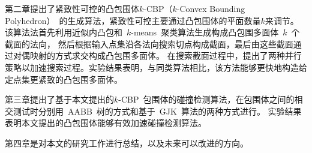 第二章提出了紧致性可控的凸包围体$k$-CBP（$k$-Convex Bounding Polyhedron）~的生成算法，紧致性可控主要通过凸包围体的平面数量$k$来调节。
该算法法首先利用近似内凸包和~$k$-means~聚类算法生成构成凸包围多面体~$k$~个截面的法向，
然后根据输入点集沿各法向搜索切点构成截面，最后由这些截面通过对偶映射的方式求交构成凸包围多面体。
在搜索截面过程中，提出了两种并行策略以加速搜索过程。实验结果表明，与同类算法相比，该方法能够更快地构造给定点集更紧致的凸包围多面体。

第三章提出了基于本文提出的$k$-CBP~包围体的碰撞检测算法，在包围体之间的相交测试时分别用~AABB~树的方式和基于~GJK~算法的两种方式进行。
实验结果表明本文提出的凸包围体能够有效加速碰撞检测算法。

第四章是对本文的研究工作进行总结，以及未来可以改进的方向。
